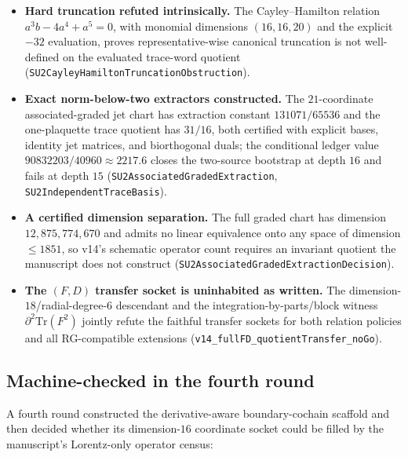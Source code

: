 \documentclass[11pt]{article}
\theoremstyle{definition}
\newcommand{\Tr}{\mathrm{Tr}}
\begin{document}
\begin{itemize}
  \item \textbf{Hard truncation refuted intrinsically.} The Cayley--Hamilton
    relation $a^3b-4a^4+a^5=0$, with monomial dimensions $(16,16,20)$ and the
    explicit $-32$ evaluation, proves representative-wise canonical truncation
    is not well-defined on the evaluated trace-word quotient
    (\texttt{SU2CayleyHamiltonTruncationObstruction}).
  \item \textbf{Exact norm-below-two extractors constructed.} The
    $21$-coordinate associated-graded jet chart has extraction constant
    $131071/65536$ and the one-plaquette trace quotient has $31/16$, both
    certified with explicit bases, identity jet matrices, and biorthogonal
    duals; the conditional ledger value $90832203/40960\approx2217.6$ closes
    the two-source bootstrap at depth $16$ and fails at depth $15$
    (\texttt{SU2AssociatedGradedExtraction},
    \texttt{SU2IndependentTraceBasis}).
  \item \textbf{A certified dimension separation.} The full graded chart has
    dimension $12{,}875{,}774{,}670$ and admits no linear equivalence onto any
    space of dimension $\leq1851$, so v14's schematic operator count requires
    an invariant quotient the manuscript does not construct
    (\texttt{SU2AssociatedGradedExtractionDecision}).
  \item \textbf{The $(F,D)$ transfer socket is uninhabited as written.} The
    dimension-$18$/radial-degree-$6$ descendant and the
    integration-by-parts/block witness $\partial^2\Tr(F^2)$ jointly refute the
    faithful transfer sockets for both relation policies and all
    RG-compatible extensions
    (\texttt{v14\_fullFD\_quotientTransfer\_noGo}).
\end{itemize}

\subsection*{Machine-checked in the fourth round}

A fourth round constructed the derivative-aware boundary-cochain scaffold and
then decided whether its dimension-$16$ coordinate socket could be filled by
the manuscript's Lorentz-only operator census:
\end{document}
